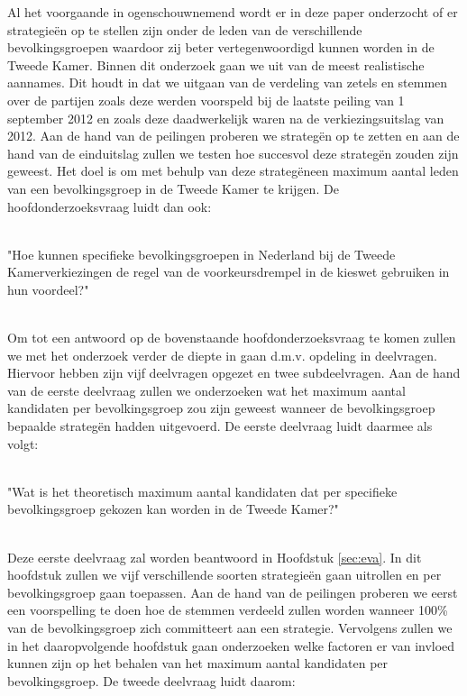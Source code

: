 Al het voorgaande in ogenschouwnemend wordt er in deze paper onderzocht of er strategie\"{e}n op te stellen zijn onder de leden van de verschillende bevolkingsgroepen waardoor zij beter vertegenwoordigd kunnen worden in de Tweede Kamer. Binnen dit onderzoek gaan we uit van de meest realistische aannames. Dit houdt in dat we uitgaan van de verdeling van zetels en stemmen over de partijen zoals deze werden voorspeld bij de laatste peiling van 1 september 2012 en zoals deze daadwerkelijk waren na de verkiezingsuitslag van 2012. Aan de hand van de peilingen proberen we strateg\"{e}n op te zetten en aan de hand van de einduitslag zullen we testen hoe succesvol deze strateg\"{e}n zouden zijn geweest. Het doel is om met behulp van deze strateg\"{e}neen maximum aantal leden van een bevolkingsgroep in de Tweede Kamer te krijgen. De hoofdonderzoeksvraag luidt dan ook: \\\


\begin{HOV}
"Hoe kunnen specifieke bevolkingsgroepen in Nederland bij de Tweede Kamerverkiezingen de regel van de voorkeursdrempel in de kieswet gebruiken in hun voordeel?"\\\
\end{HOV}
\normalsize

Om tot een antwoord op de bovenstaande hoofdonderzoeksvraag te komen zullen we met het onderzoek verder de diepte in gaan d.m.v. opdeling in deelvragen. Hiervoor hebben zijn vijf deelvragen opgezet en twee subdeelvragen. Aan de hand van de eerste deelvraag zullen we onderzoeken wat het maximum aantal kandidaten per bevolkingsgroep zou zijn geweest wanneer de bevolkingsgroep bepaalde strateg\"{e}n hadden uitgevoerd. De eerste deelvraag luidt daarmee als volgt:\\\

\begin{DV}
"Wat is het theoretisch maximum aantal kandidaten dat per specifieke bevolkingsgroep gekozen kan worden in de Tweede Kamer?"\\\
\end{DV}

Deze eerste deelvraag zal worden beantwoord in Hoofdstuk \ref{sec:eva}. In dit hoofdstuk zullen we vijf verschillende soorten strategie\"{e}n gaan uitrollen en per  bevolkingsgroep gaan toepassen. Aan de hand van de peilingen proberen we eerst een voorspelling te doen hoe de stemmen verdeeld zullen worden wanneer 100\% van de bevolkingsgroep zich committeert aan een strategie. Vervolgens zullen we in het daaropvolgende hoofdstuk gaan onderzoeken welke factoren er van invloed kunnen zijn op het behalen van het maximum aantal kandidaten per bevolkingsgroep. De tweede deelvraag luidt daarom: \\

